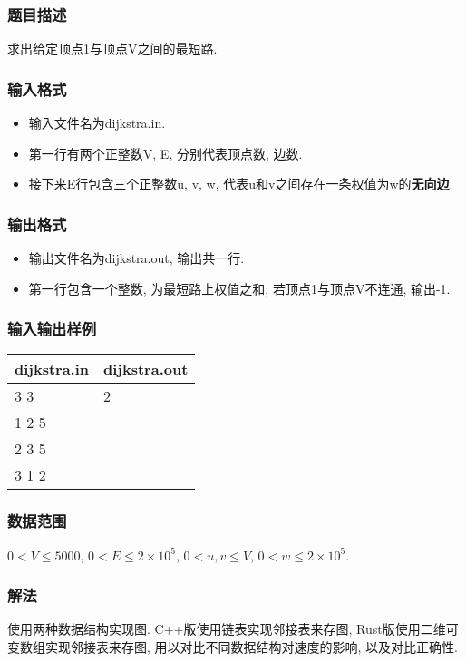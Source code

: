 \subsubsection{题目描述}
求出给定顶点1与顶点V之间的最短路.
\subsubsection{输入格式}
\begin{itemize}
	\item 输入文件名为dijkstra.in.
	\item 第一行有两个正整数V, E, 分别代表顶点数, 边数.
	\item 接下来E行包含三个正整数u, v, w, 代表u和v之间存在一条权值为w的\textbf{无向边}.
\end{itemize}

\subsubsection{输出格式}
\begin{itemize}
	\item 输出文件名为dijkstra.out, 输出共一行.
	\item 第一行包含一个整数, 为最短路上权值之和, 若顶点1与顶点V不连通, 输出-1.
\end{itemize}

\subsubsection{输入输出样例}
\begin{table}[h!]
	\centering
	\begin{tabular}{|l|l|}
		\hline
		dijkstra.in & dijkstra.out \\
		\hline
		3 3         & 2            \\
		1 2 5       & ~            \\
		2 3 5       & ~            \\
		3 1 2       & ~            \\
		\hline
	\end{tabular}
\end{table}

\subsubsection{数据范围}
$0 < V \leq 5000$,
$0 < E \leq 2\times 10^5$,
$0 < u,v \leq V$,
$0 < w \leq 2\times 10^5$.

\subsubsection{解法}
使用两种数据结构实现图. C++版使用链表实现邻接表来存图,
Rust版使用二维可变数组实现邻接表来存图, 用以对比不同数据结构对速度的影响,
以及对比正确性.

